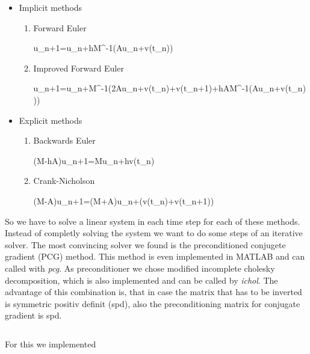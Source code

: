 \begin{itemize}
	\item Implicit methods
	\begin{enumerate}[label=\arabic*.)]
		\item Forward Euler
		\begin{flalign*}
			u_{n+1}=u_n+hM^{-1}(Au_n+v(t_n))
		\end{flalign*}
		\item Improved Forward Euler
		\begin{flalign*}
			u_{n+1}=u_n+M^{-1}\left(2Au_n+v(t_n)+v(t_{n+1})+hA\cdot M^{-1}\left(Au_n+v(t_n)\right)\right)
		\end{flalign*}
	\end{enumerate}
	\item Explicit methods
	\begin{enumerate}[resume,label=\arabic*.)]
		\item Backwards Euler
		\begin{flalign*}
			(M-hA)u_{n+1}=Mu_n+hv(t_n)
		\end{flalign*}
		\item Crank-Nicholson
		\begin{flalign*}
			(M-A)u_{n+1}=(M+\frac{h}{2}A)u_n+(v(t_n)+v(t_{n+1}))
		\end{flalign*}
	\end{enumerate}
\end{itemize}
So we have to solve a linear system in each time step for each of these methods. Instead of completly solving the system we want to do some steps of an iterative solver. The most convincing solver we found is the preconditioned conjugete gradient (PCG) method. This method is even implemented in MATLAB and can called with \emph{pcg}. As preconditioner we chose modified incomplete cholesky decomposition, which is also implemented and can be called by \emph{ichol}. The advantage of this combination is, that in case the matrix that has to be inverted is symmetric positiv definit (spd), also the preconditioning matrix for conjugate gradient is spd.

\begin{lstlisting}[language=bash]
\end{lstlisting}

For this we implemented
